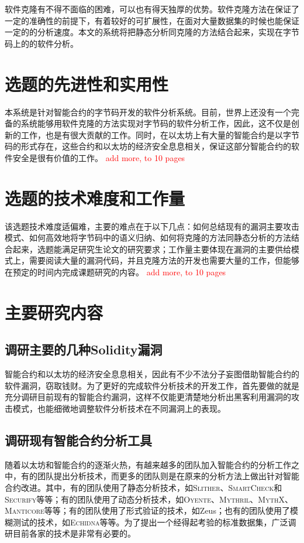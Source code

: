 软件克隆有不得不面临的困难，可以也有得天独厚的优势。软件克隆方法在保证了一定的准确性的前提下，有着较好的可扩展性，在面对大量数据集的时候也能保证一定的的分析速度。本文的系统将把静态分析同克隆的方法结合起来，实现在字节码上的的软件分析。

\section{选题的先进性和实用性}

本系统是针对智能合约的字节码开发的软件分析系统。目前，世界上还没有一个完备的系统能够用软件克隆的方法实现对字节码的软件分析工作，因此，这不仅是创新的工作，也是有很大贡献的工作。同时，在以太坊上有大量的智能合约是以字节码的形式存在，这些合约和以太坊的经济安全息息相关，保证这部分智能合约的软件安全是很有价值的工作。
\textcolor{red}{add more, to 10 pages}

\section{选题的技术难度和工作量}

该选题技术难度适偏难，主要的难点在于以下几点：如何总结现有的漏洞主要攻击模式、如何高效地将字节码中的语义归纳、如何将克隆的方法同静态分析的方法结合起来，选题能满足研究生论文的研究要求；工作量主要体现在漏洞的主要供给模式上，需要阅读大量的漏洞代码，并且克隆方法的开发也需要大量的工作，但能够在预定的时间内完成课题研究的内容。
\textcolor{red}{add more, to 10 pages}

\section{主要研究内容}

\subsection{调研主要的几种Solidity漏洞}

智能合约和以太坊的经济安全息息相关，因此有不少不法分子妄图借助智能合约的软件漏洞，窃取钱财。为了更好的完成软件分析技术的开发工作，首先要做的就是充分调研目前现有的智能合约漏洞，这样不仅能更清楚地分析出黑客利用漏洞的攻击模式，也能细微地调整软件分析技术在不同漏洞上的表现。

\subsection{调研现有智能合约分析工具}

随着以太坊和智能合约的逐渐火热，有越来越多的团队加入智能合约的分析工作之中，有的团队提出分析技术，而更多的团队则是在原来的分析方法上做出针对智能合约改进。其中，有的团队使用了静态分析技术，如\textsc{Slither}、\textsc{SmartCheck}和\textsc{Securify}等等；有的团队使用了动态分析技术，如\textsc{Oyente}、\textsc{Mythril}、\textsc{MythX}、\textsc{Manticore}等等；有的团队使用了形式验证的技术，如Zeus；也有的团队使用了模糊测试的技术，如\textsc{Echidna}等等。为了提出一个经得起考验的标准数据集，广泛调研目前各家的技术是非常有必要的。

